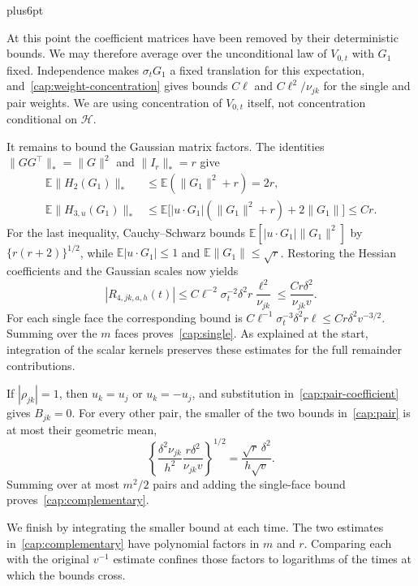 \documentclass[11pt,letterpaper,twoside,leqno]{article}
\makeatletter
\theoremstyle{bookplain}
\theoremstyle{bookremark}
\renewenvironment{proof}[1][\proofname]{\par
  \pushQED{\qed}\normalfont\topsep6pt plus6pt\relax
  \trivlist\item[\hskip\labelsep\bfseries #1\@addpunct{.}]\ignorespaces
}{\popQED\endtrivlist\@endpefalse}
\newcommand{\E}{\mathbb E}
\makeatother
\begin{document}
\begin{proof}
At this point the coefficient matrices have been removed by
their deterministic bounds. We may therefore average over
the unconditional law of $V_{0,t}$ with $G_1$ fixed.
Independence makes $\sigma_tG_1$ a fixed translation for this
expectation, and~\eqref{cap:weight-concentration} gives bounds
$C\ell$ and $C\ell^2/\nu_{jk}$ for the single and pair
weights. We are using concentration of $V_{0,t}$ itself,
not concentration conditional on $\mathcal H$.

It remains to bound the Gaussian matrix factors. The identities
$\|GG^\top\|_*=\|G\|^2$ and $\|I_r\|_*=r$ give
\[
 \begin{aligned}
 \E\|H_2(G_1)\|_*&\le\E(\|G_1\|^2+r)=2r,\\
 \E\|H_{3,u}(G_1)\|_*
 &\le\E\bigl[|u\cdot G_1|(\|G_1\|^2+r)
                                      +2\|G_1\|\bigr]\le Cr.
 \end{aligned}
\]
For the last inequality, Cauchy--Schwarz bounds
$\E[|u\cdot G_1|\|G_1\|^2]$ by
$\{r(r+2)\}^{1/2}$, while
$\E|u\cdot G_1|\le1$ and $\E\|G_1\|\le\sqrt r$.
Restoring the Hessian coefficients and the Gaussian scales now
yields
\[
 |R_{4,jk,a,h}(t)|
 \le C\ell^{-2}\sigma_t^{-2}\delta^2r
                    \frac{\ell^2}{\nu_{jk}}
 \le\frac{Cr\delta^2}{\nu_{jk}v}.
\]
For each single face the corresponding bound is
$C\ell^{-1}\sigma_t^{-3}\delta^2r\ell
 \le Cr\delta^2v^{-3/2}$.
Summing over the $m$ faces proves~\eqref{cap:single}.
As explained at the start, integration of the scalar kernels
preserves these estimates for the full remainder contributions.

If $|\rho_{jk}|=1$, then $u_k=u_j$ or $u_k=-u_j$,
and substitution in~\eqref{cap:pair-coefficient} gives
$B_{jk}=0$. For every other pair, the smaller of the two
bounds in~\eqref{cap:pair} is at most their geometric mean,
\[
 \left\{\frac{\delta^2\nu_{jk}}{h^2}
         \frac{r\delta^2}{\nu_{jk}v}\right\}^{1/2}
 =\frac{\sqrt r\,\delta^2}{h\sqrt v}.
\]
Summing over at most $m^2/2$ pairs and adding the single-face
bound proves~\eqref{cap:complementary}.
\end{proof}

We finish by integrating the smaller bound at each time.
The two estimates in~\eqref{cap:complementary} have polynomial
factors in $m$ and $r$. Comparing each with the original
$v^{-1}$ estimate confines those factors to logarithms of
the times at which the bounds cross.
\end{document}
